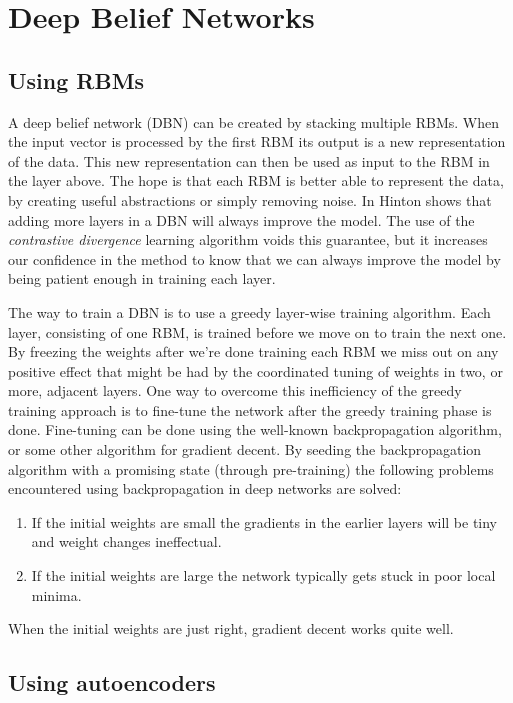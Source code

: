 \documentclass[11pt]{article}
\begin{document}
\section{Deep Belief Networks}

\subsection{Using RBMs}

A deep belief network (DBN) can be created by stacking multiple RBMs.  When the input vector is processed by the first RBM its output is a new representation of the data.  This new representation can then be used as input to the RBM in the layer above.  The hope is that each RBM is better able to represent the data, by creating useful abstractions or simply removing noise.  In \cite{hinton06} Hinton shows that adding more layers in a DBN will always improve the model.  The use of the \textit{contrastive divergence} learning algorithm voids this guarantee, but it increases our confidence in the method to know that we can always improve the model by being patient enough in training each layer.

The way to train a DBN is to use a greedy layer-wise training algorithm.  Each layer, consisting of one RBM, is trained before we move on to train the next one.  By freezing the weights after we're done training each RBM we miss out on any positive effect that might be had by the coordinated tuning of weights in two, or more, adjacent layers.  One way to overcome this inefficiency of the greedy training approach is to fine-tune the network after the greedy training phase is done.  Fine-tuning can be done using the well-known backpropagation algorithm, or some other algorithm for gradient decent.  By seeding the backpropagation algorithm with a promising state (through pre-training) the following problems encountered using backpropagation in deep networks are solved\cite{hinton06reducing}:
\begin{enumerate}
\item If the initial weights are small the gradients in the earlier layers will be tiny and weight changes ineffectual.
\item If the initial weights are large the network typically gets stuck in poor local minima.
\end{enumerate}

When the initial weights are just right, gradient decent works quite well.

\subsection{Using autoencoders}
\end{document}
